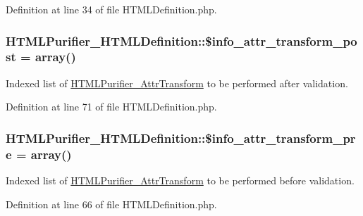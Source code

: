 Definition at line 34 of file H\+T\+M\+L\+Definition.\+php.

\hypertarget{classHTMLPurifier__HTMLDefinition_a80c26abf49745da3b4b777610a65b03e}{
\subsubsection[{\$info\+\_\+attr\+\_\+transform\+\_\+post}]{\setlength{\rightskip}{0pt plus 5cm}H\+T\+M\+L\+Purifier\+\_\+\+H\+T\+M\+L\+Definition\+::\$info\+\_\+attr\+\_\+transform\+\_\+post = array()}}\label{classHTMLPurifier__HTMLDefinition_a80c26abf49745da3b4b777610a65b03e}
Indexed list of \hyperlink{classHTMLPurifier__AttrTransform}{H\+T\+M\+L\+Purifier\+\_\+\+Attr\+Transform} to be performed after validation. 

Definition at line 71 of file H\+T\+M\+L\+Definition.\+php.

\hypertarget{classHTMLPurifier__HTMLDefinition_a6611f980f1032f5f9ba85c2b2c5eb867}{
\subsubsection[{\$info\+\_\+attr\+\_\+transform\+\_\+pre}]{\setlength{\rightskip}{0pt plus 5cm}H\+T\+M\+L\+Purifier\+\_\+\+H\+T\+M\+L\+Definition\+::\$info\+\_\+attr\+\_\+transform\+\_\+pre = array()}}\label{classHTMLPurifier__HTMLDefinition_a6611f980f1032f5f9ba85c2b2c5eb867}
Indexed list of \hyperlink{classHTMLPurifier__AttrTransform}{H\+T\+M\+L\+Purifier\+\_\+\+Attr\+Transform} to be performed before validation. 

Definition at line 66 of file H\+T\+M\+L\+Definition.\+php.

